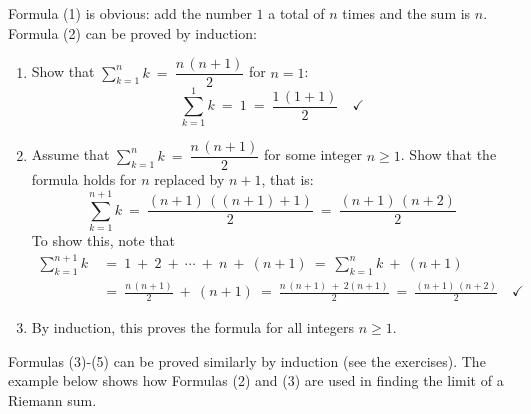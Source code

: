
\noindent Formula (1) is obvious: add the number $1$ a total of $n$ times and
the sum is $n$.\\Formula (2) can be proved by induction:

\begin{enumerate}
 \item Show that $\displaystyle\sum_{k=1}^{n} k ~=~ \dfrac{n\,(n + 1)}{2}$ for
 $n=1$:
\[
\sum_{k=1}^{1} k ~=~ 1 ~=~ \frac{1\,(1 + 1)}{2} \quad\checkmark
\]
 \item Assume that $\displaystyle\sum_{k=1}^{n} k ~=~ \dfrac{n\,(n + 1)}{2}$ for
 some integer $n \ge 1$. Show that the formula holds for $n$ replaced by $n+1$,
 that is:
\[
\sum_{k=1}^{n+1} k ~=~ \frac{(n + 1)\,((n + 1) + 1)}{2} ~=~
\frac{(n + 1)\,(n + 2)}{2}
\]
To show this, note that
\begin{align*}
 \sum_{k=1}^{n+1} k ~&=~ 1 ~+~ 2 ~+~ \cdots ~+~ n ~+~ (n+1)
  ~=~ \sum_{k=1}^{n} k ~+~ (n+1)\\[6pt]
&=~ \frac{n\,(n + 1)}{2} ~+~ (n+1) ~=~ \frac{n\,(n + 1) ~+~ 2(n+1)}{2} ~=~
\frac{(n + 1)\,(n + 2)}{2} \quad\checkmark
\end{align*}
 \item By induction, this proves the formula for all integers $n \ge 1$.
\quad\qedsymbol
\end{enumerate}
\newpage
\noindent Formulas (3)-(5) can be proved similarly by induction (see the
exercises). The example below shows how Formulas (2) and (3) are used in finding
the limit of a Riemann sum.

